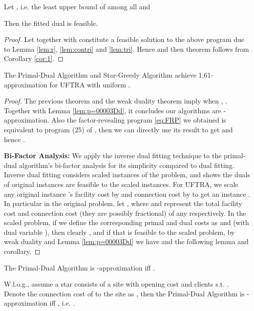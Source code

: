 \documentclass[10pt]{llncs}
\begin{document}
\begin{theorem}
Let , i.e. the least
upper bound of  among all  and\label{thm:FRL}{\small 
}{\small \par}

Then the fitted dual is feasible.\end{theorem}
\begin{proof}
Let  together with 
constitute a feasible solution to the above program due to Lemma \ref{lem:r},
\ref{lem:contri} and \ref{lem:tri}. Hence 
 and then theorem follows from Corollary
\ref{cor:1}.\end{proof}
\begin{theorem}
The Primal-Dual Algorithm and Star-Greedy Algorithm achieve 1.61-approximation
for UFTRA with uniform .\end{theorem}
\begin{proof}
The previous theorem and the weak duality theorem imply when ,
. Together with Lemma \ref{lem:p=00003Dd},
it concludes our algorithms are -approximation. Also the factor-revealing
program \eqref{eq:FRP} we obtained is equivalent to program (25)
of \cite{Jain03dualfitting}, then we can directly use its result
to get  and hence .\medskip{}


\textbf{Bi-Factor Analysis: }We apply the inverse dual fitting technique
\cite{shihongftfa} to the primal-dual algorithm's bi-factor analysis
for its simplicity compared to dual fitting. Inverse dual fitting
considers scaled instances of the problem, and shows the duals of
original instances are feasible to the scaled instances. For UFTRA,
we scale any original instance 's facility cost by 
and connection cost by  to get an instance .
In particular in the original problem, let ,
where  and  represent the total facility cost
and connection cost (they are possibly fractional) of any 
respectively. In the scaled problem, if we define the corresponding
primal and dual costs as  and  (with dual variable
), then clearly ,
and if  that is feasible to the scaled problem,
by weak duality and Lemma \ref{lem:p=00003Dd} we have 
and the following lemma and corollary.\end{proof}
\begin{lemma}
The Primal-Dual Algorithm is -approximation
iff .\end{lemma}
\begin{corollary}
W.l.o.g., assume a star  consists of a site with opening cost
 and  clients s.t. .
Denote the connection cost of  to the site as , then
the Primal-Dual Algorithm is -approximation
iff ,
i.e. .\label{cor:2}
\end{corollary}
\end{document}
